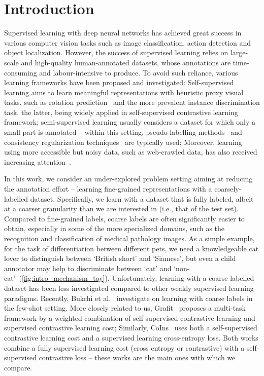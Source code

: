 \documentclass[10pt,twocolumn,letterpaper]{article}
\begin{document}
\section{Introduction}
Supervised learning with deep neural networks has achieved great success in various computer vision tasks such as image classification, action detection and object localization. However, the success of supervised learning relies on large-scale and high-quality human-annotated datasets, whose annotations are time-consuming and labour-intensive to produce. To avoid such reliance, various learning frameworks have been proposed and investigated: Self-supervised learning aims to learn meaningful representations with heuristic proxy visual tasks, such as rotation prediction~\cite{gidaris2018rotpredict} and the more prevalent instance discrimination task, the latter, being widely applied in self-supervised contrastive learning framework; semi-supervised learning usually considers a dataset for which only a small part is annotated -- within this setting, pseudo labelling methods~\cite{pseudolabelling} and consistency regularization techniques~\cite{mixmatch, fixmatch} are typically used; Moreover, learning using more accessible but noisy data, such as web-crawled data, has also received increasing attention~\cite{ssr, dividemix}.

In this work, we consider an under-explored problem setting aiming at reducing the annotation effort -- learning fine-grained representations with a coarsely-labelled dataset. Specifically, we learn with a dataset that is fully labeled, albeit at a coarser granularity than we are interested in (i.e., that of the test set). Compared to fine-grained labels, coarse labels are often significantly easier to obtain, especially in some of the more specialized domains, such as the recognition and classification of medical pathology images. As a simple example, for the task of differentiation between different pets, we need a knowledgeable cat lover to distinguish between `British short' and `Siamese', but even a child annotator may help to discriminate between `cat' and `non-cat'~(\cref{fig:intro_mechanism_toy}). 
Unfortunately, learning with a coarse labelled dataset has been less investigated compared to other weakly supervised learning paradigms. 
Recently, Bukchi et al.~\cite{coarse_fewshot} investigate on learning with coarse labels in the few-shot setting. More closely related to us, Grafit~\cite{touvron2021grafit} proposes a multi-task framework by a weighted combination of self-supervised contrastive learning and supervised contrastive learning cost; Similarly, CoIns~\cite{xu2021coins} uses both a self-supervised contrastive learning cost and a supervised learning cross-entropy loss. Both works combine a fully supervised learning cost (cross entropy or contrastive) with a self-supervised contrastive loss -- these works are the main ones with which we compare. 
\end{document}
